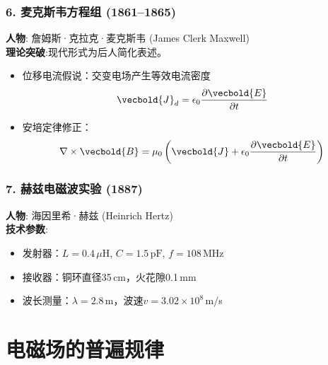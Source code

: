 \subsection*{6. 麦克斯韦方程组 (1861--1865)}
\textbf{人物}: 詹姆斯·克拉克·麦克斯韦 (James Clerk Maxwell)\\
\textbf{理论突破}:现代形式为后人简化表述。
\begin{itemize}
    \item 位移电流假说：交变电场产生等效电流密度
    \begin{equation*}
        \vecbold{J}_d = \epsilon_0 \frac{\partial \vecbold{E}}{\partial t}
    \end{equation*}
    \item 安培定律修正：
    \begin{equation*}
        \nabla \times \vecbold{B} = \mu_0\left( \vecbold{J} + \epsilon_0 \frac{\partial \vecbold{E}}{\partial t} \right)
    \end{equation*}
\end{itemize}

\subsection*{7. 赫兹电磁波实验 (1887)}
\textbf{人物}: 海因里希·赫兹 (Heinrich Hertz)\\
\textbf{技术参数}:
\begin{itemize}
    \item 发射器：$L=0.4\,\mu\text{H}$, $C=1.5\,\text{pF}$, $f=108\,\text{MHz}$
    \item 接收器：铜环直径35\,cm，火花隙0.1\,mm
    \item 波长测量：$\lambda=2.8$\,m，波速$v=3.02\times10^8$\,m/s
\end{itemize}
\chapter{电磁场的普遍规律}
